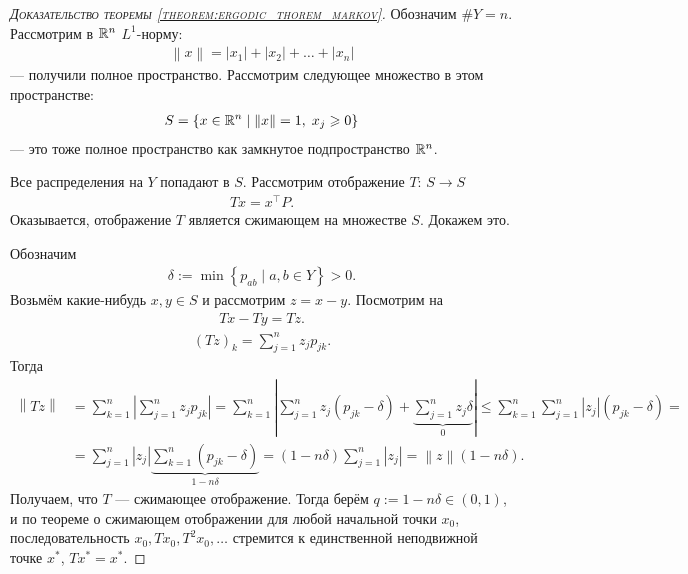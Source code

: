 \documentclass[../main.tex]{subfiles}
\begin{document}
\begin{proof}[\normalfont\textsc{Доказательство теоремы \ref{theorem:ergodic_thorem_markov}}]
 Обозначим $ \# Y = n $. Рассмотрим в $ \mathbb{R}^{n} $ $ L^{1} $-норму:
 \begin{align*}
  \left\| x \right\| = \left| x_1 \right| + \left| x_2 \right| + \ldots + \left| x_n \right|
 \end{align*} --- получили полное пространство. Рассмотрим следующее множество в этом пространстве:
 \begin{align*}
  S = \left\{ x \in \mathbb{R}^{n} \mid \left\| x \right\| = 1,\; x_j \geqslant 0 \right\}
 \end{align*} --- это тоже полное пространство как замкнутое подпространство $ \mathbb{R}^{n} $.

 Все распределения на $ Y $ попадают в $ S $. Рассмотрим отображение $ T \colon\,S\to S $
 \begin{align*}
  T x = x^{\top} P.
 \end{align*} Оказывается, отображение $ T $ является сжимающем на множестве $ S $. Докажем это.

 Обозначим
 \begin{align*}
  \delta := \min \left\{ p_{ab} \mid a,b\in Y \right\} > 0.
 \end{align*} Возьмём какие-нибудь $ x,y \in S $ и рассмотрим $ z = x - y $. Посмотрим на
 \begin{align*}
  Tx - Ty = Tz.
 \end{align*}
 \begin{align*}
  (Tz)_k = \sum_{j=1}^{n} z_j p_{jk}.
 \end{align*} Тогда
 \begin{align*}
  \left\| Tz \right\| &= \sum_{k=1}^{n} \left|\sum_{j=1}^{n} z_j p_{jk} \right| = \sum_{k=1}^{n} \left| \sum_{j=1}^{n} z_j(p_{jk} - \delta) + \underbrace{\sum_{j=1}^{n} z_j \delta}_0 \right| \leqslant \sum_{k=1}^{n} \sum_{j=1}^{n} \left| z_j \right|(p_{jk} - \delta) = \\
  &= \sum_{j=1}^{n} \left| z_j \right| \underbrace{\sum_{k=1}^{n} (p_{jk} - \delta)}_{1-n\delta} = (1-n\delta) \sum_{j=1}^{n} \left| z_j \right| = \left\| z \right\|(1 - n\delta).
 \end{align*} Получаем, что $ T $ --- сжимающее отображение. Тогда берём $ q := 1 - n\delta \in (0,1) $, и по теореме о сжимающем отображении для любой начальной точки $ x_0 $, последовательность $ x_0, T x_0, T^{2} x_0, \ldots $ стремится к единственной неподвижной точке $ x^{\ast} $, $ T x^{\ast}= x^{\ast} $.
\end{proof}
\end{document}
